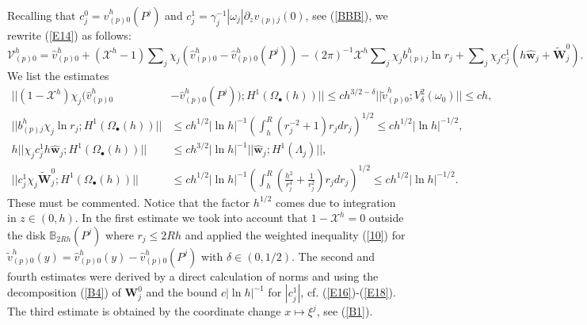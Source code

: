 \documentclass[11pt]{article}%
\numberwithin{equation}{section}
\begin{document}
Recalling that $c_{j}^{0}=\widehat{v}_{(p)0}^{h}(P^{j})$ and $c_{j}^{1}%
=\gamma_{j}^{-1}|\omega_{j}|\partial_{z}v_{(p)j}(0)$, see (\ref{BBB}), we
rewrite (\ref{E14}) as follows:%
\[
\mathcal{V}_{(p)0}^{h}=\widehat{v}_{(p)0}^{h}+(\mathcal{X}^{h}-1)%
{\textstyle\sum\nolimits_{j}}
\chi_{j}(\widehat{v}_{(p)0}^{h}-\widehat{v}_{(p)0}^{h}(P^{j}))-(2\pi
)^{-1}\mathcal{X}^{h}%
{\textstyle\sum\nolimits_{j}}
\chi_{j}b_{(p)j}^{h}\ln r_{j}+%
{\textstyle\sum\nolimits_{j}}
\chi_{j}c_{j}^{1}(h\widehat{\mathbf{w}}_{j}+\widetilde{\mathbf{W}}_{j}^{0}).
\]
We list the estimates%
\begin{align}
||(1-\mathcal{X}^{h})\chi_{j}(\widehat{v}_{(p)0}^{h}  &  -\widehat{v}%
_{(p)0}^{h}(P^{j}));H^{1}(\Omega_{\bullet}(h))||\leq ch^{3/2-\delta
}||\widetilde{v}_{(p)0}^{h};V_{\delta}^{2}(\omega_{0})||\leq ch,\label{E19}\\
||b_{(p)j}^{h}\chi_{j}\ln r_{j};H^{1}(\Omega_{\bullet}(h))||  &  \leq
ch^{1/2}|\ln h|^{-1}\left(  \int_{h}^{R}(r_{j}^{-2}+1)r_{j}dr_{j}\right)
^{1/2}\leq ch^{1/2}|\ln h|^{-1/2},\nonumber\\
h||\chi_{j}c_{j}^{1}h\widehat{\mathbf{w}}_{j};H^{1}(\Omega_{\bullet}(h))||  &
\leq ch^{3/2}|\ln h|^{-1}||\widehat{\mathbf{w}}_{j};H^{1}(\Lambda
_{j})||,\nonumber\\
||c_{j}^{1}\chi_{j}\widetilde{\mathbf{W}}_{j}^{0};H^{1}(\Omega_{\bullet
}(h))||  &  \leq ch^{1/2}|\ln h|^{-1}\left(  \int_{h}^{R}\left(  \frac{h^{2}%
}{r_{j}^{4}}+\frac{1}{r_{j}^{2}}\right)  r_{j}dr_{j}\right)  ^{1/2}\leq
ch^{1/2}|\ln h|^{-1/2}.\nonumber
\end{align}
These must be commented. Notice that the factor $h^{1/2}$ comes due to
integration in $z\in(0,h)$. In the first estimate we took into account that
$1-\mathcal{X}^{h}=0$ outside the disk $\mathbb{B}_{2Rh}(P^{j})$ where
$r_{j}\leq2Rh$ and applied the weighted inequality (\ref{10}) for
$\widetilde{v}_{(p)0}^{h}(y)=\widehat{v}_{(p)0}^{h}(y)-\widehat{v}_{(p)0}%
^{h}(P^{j})$ with $\delta\in(0,1/2)$. The second and fourth estimates were
derived by a direct calculation of norms and using the decomposition
(\ref{B4}) of $\mathbf{W}_{j}^{0}$ and the bound $c|\ln h|^{-1}$ for
$|c_{j}^{1}|$, cf. (\ref{E16})-(\ref{E18}). The third estimate is obtained by
the coordinate change $x\mapsto\xi^{j}$, see (\ref{B1}).
\end{document}
